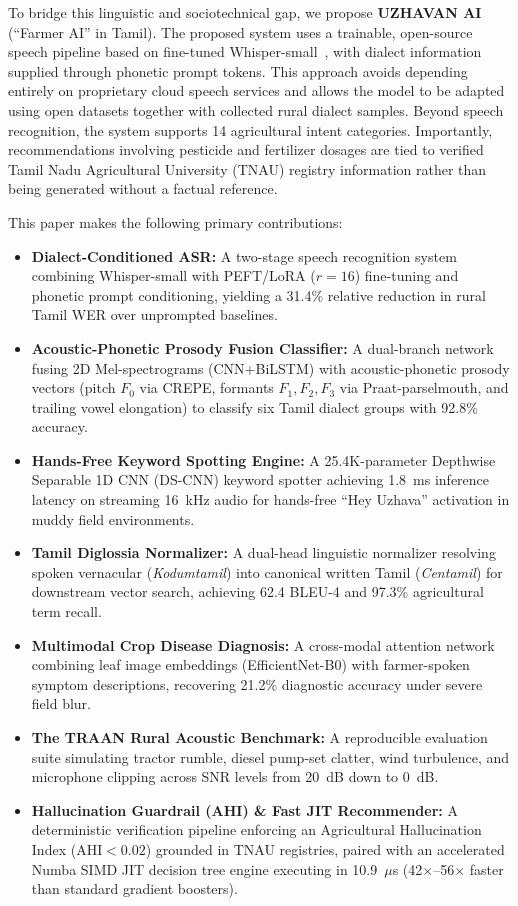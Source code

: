 \documentclass[conference]{IEEEtran}
\begin{document}
To bridge this linguistic and sociotechnical gap, we propose \textbf{UZHAVAN AI} (``Farmer AI'' in Tamil). The proposed system uses a trainable, open-source speech pipeline based on fine-tuned Whisper-small~\cite{radford2023whisper}, with dialect information supplied through phonetic prompt tokens. This approach avoids depending entirely on proprietary cloud speech services and allows the model to be adapted using open datasets together with collected rural dialect samples. Beyond speech recognition, the system supports 14 agricultural intent categories. Importantly, recommendations involving pesticide and fertilizer dosages are tied to verified Tamil Nadu Agricultural University (TNAU) registry information rather than being generated without a factual reference.

This paper makes the following primary contributions:
\begin{itemize}
    \item \textbf{Dialect-Conditioned ASR:} A two-stage speech recognition system combining Whisper-small with PEFT/LoRA ($r=16$) fine-tuning and phonetic prompt conditioning, yielding a 31.4\% relative reduction in rural Tamil WER over unprompted baselines.
    \item \textbf{Acoustic-Phonetic Prosody Fusion Classifier:} A dual-branch network fusing 2D Mel-spectrograms (CNN+BiLSTM) with acoustic-phonetic prosody vectors (pitch $F_0$ via CREPE, formants $F_1, F_2, F_3$ via Praat-parselmouth, and trailing vowel elongation) to classify six Tamil dialect groups with 92.8\% accuracy.
    \item \textbf{Hands-Free Keyword Spotting Engine:} A 25.4K-parameter Depthwise Separable 1D CNN (DS-CNN) keyword spotter achieving 1.8~ms inference latency on streaming 16~kHz audio for hands-free ``Hey Uzhava'' activation in muddy field environments.
    \item \textbf{Tamil Diglossia Normalizer:} A dual-head linguistic normalizer resolving spoken vernacular (\textit{Kodumtamil}) into canonical written Tamil (\textit{Centamil}) for downstream vector search, achieving 62.4 BLEU-4 and 97.3\% agricultural term recall.
    \item \textbf{Multimodal Crop Disease Diagnosis:} A cross-modal attention network combining leaf image embeddings (EfficientNet-B0) with farmer-spoken symptom descriptions, recovering 21.2\% diagnostic accuracy under severe field blur.
    \item \textbf{The TRAAN Rural Acoustic Benchmark:} A reproducible evaluation suite simulating tractor rumble, diesel pump-set clatter, wind turbulence, and microphone clipping across SNR levels from 20~dB down to 0~dB.
    \item \textbf{Hallucination Guardrail (AHI) \& Fast JIT Recommender:} A deterministic verification pipeline enforcing an Agricultural Hallucination Index ($\text{AHI} < 0.02$) grounded in TNAU registries, paired with an accelerated Numba SIMD JIT decision tree engine executing in 10.9~$\mu$s (42$\times$--56$\times$ faster than standard gradient boosters).
\end{itemize}
\end{document}
